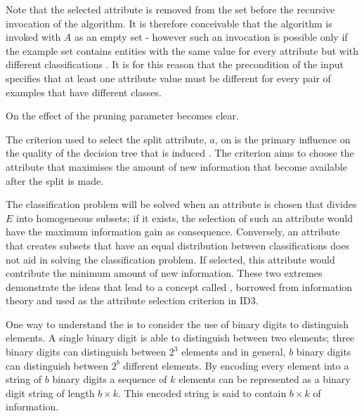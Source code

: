 Note that the selected attribute is removed from the set before the recursive invocation of the algorithm. It is therefore conceivable that the algorithm is invoked with $A$ as an empty set - however such an invocation is possible only if the example set contains entities with the same value for every attribute but with different classifications \cite{bratko:learning}.  It is for this reason that the precondition of the input specifies that at least one attribute value must be different for every pair of examples that have different classes.

On  the effect of the pruning parameter becomes clear.  

The criterion used to select the split attribute, $a$, on  is the primary influence on the quality of the decision tree that is induced \cite{kubat:review}. The  criterion aims to choose the attribute that maximises the amount of new information that become available after the split is made. 

The classification problem will be solved when an attribute is chosen that divides $E$ into homogeneous subsets; if it exists, the selection of such an attribute would have the maximum information gain as consequence.  Conversely, an attribute that creates subsets that have an equal distribution between classifications does not aid in solving the classification problem. If selected, this attribute would contribute the minimum amount of new information. These two extremes demonstrate the ideas that lead to a concept called  \cite{shannon:theory}, borrowed from information theory and used as the attribute selection criterion in ID3.


One way to understand the  is to consider the use of binary digits to distinguish elements.  A single  binary digit is able to distinguish between two elements; three binary digits can distinguish between $2^3$ elements and in general, $b$ binary digits can distinguish between $2^b$ different elements. By encoding every element into a string of $b$ binary digits a sequence of $k$ elements can be represented as a binary digit string of length $b \times k$.  This encoded string is said to contain $b \times k$  of information.  

